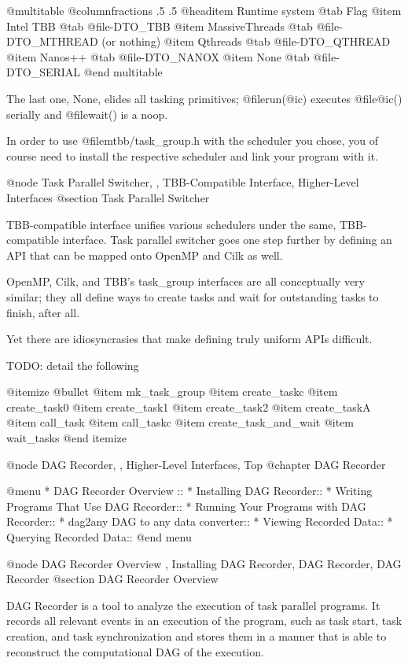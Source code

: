 @multitable @columnfractions .5 .5
@headitem Runtime system @tab Flag 
@item Intel TBB      @tab @file{-DTO_TBB}
@item MassiveThreads @tab @file{-DTO_MTHREAD} (or nothing)
@item Qthreads       @tab @file{-DTO_QTHREAD}
@item Nanos++        @tab @file{-DTO_NANOX}
@item None           @tab @file{-DTO_SERIAL}
@end multitable

The last one, None, elides all tasking primitives; @file{run(@i{c})} executes @file{@i{c}()} serially and @file{wait()} is a noop.  

In order to use @file{mtbb/task_group.h} with the scheduler you chose, you of course need to install the respective scheduler and link your program with it.  

@node Task Parallel Switcher,  , TBB-Compatible Interface, Higher-Level Interfaces
@section  Task Parallel Switcher

TBB-compatible interface unifies various schedulers under the same,
TBB-compatible interface.  Task parallel switcher goes one step further 
by defining an API that can be mapped onto OpenMP and Cilk as well.

OpenMP, Cilk, and TBB's task_group interfaces are all conceptually very
similar; they all define ways to create tasks and wait for outstanding
tasks to finish, after all.

Yet there are idiosyncrasies that make defining truly uniform APIs
difficult.  

TODO: detail the following

@itemize @bullet
@item mk_task_group
@item create_taskc
@item create_task0
@item create_task1
@item create_task2
@item create_taskA
@item call_task
@item call_taskc
@item create_task_and_wait
@item wait_tasks
@end itemize

@node DAG Recorder,  , Higher-Level Interfaces, Top
@chapter DAG Recorder

@menu
* DAG Recorder Overview ::
* Installing DAG Recorder::
* Writing Programs That Use DAG Recorder::
* Running Your Programs with DAG Recorder::
* dag2any DAG to any data converter::
* Viewing Recorded Data::
* Querying Recorded Data::
@end menu

@node DAG Recorder Overview , Installing DAG Recorder, DAG Recorder, DAG Recorder
@section DAG Recorder Overview 

DAG Recorder is a tool to analyze the execution of task parallel
programs.  It records all relevant events in an execution of the
program, such as task start, task creation, and task synchronization and
stores them in a manner that is able to reconstruct the computational
DAG of the execution.

